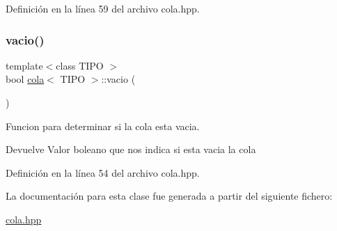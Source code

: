Definición en la línea 59 del archivo cola.\+hpp.

\mbox{\label{classcola_a2af9a71dd856a907f446a1e396d83e5b}} 
\subsubsection{\texorpdfstring{vacio()}{vacio()}}
{\footnotesize\ttfamily template$<$class T\+I\+PO $>$ \\
bool \hyperlink{classcola}{cola}$<$ T\+I\+PO $>$\+::vacio (\begin{DoxyParamCaption}{ }\end{DoxyParamCaption})}



Funcion para determinar si la cola esta vacia. 

\begin{DoxyReturn}{Devuelve}
Valor boleano que nos indica si esta vacia la cola 
\end{DoxyReturn}


Definición en la línea 54 del archivo cola.\+hpp.



La documentación para esta clase fue generada a partir del siguiente fichero\+:\begin{DoxyCompactItemize}
\item 
\hyperlink{cola_8hpp}{cola.\+hpp}\end{DoxyCompactItemize}
